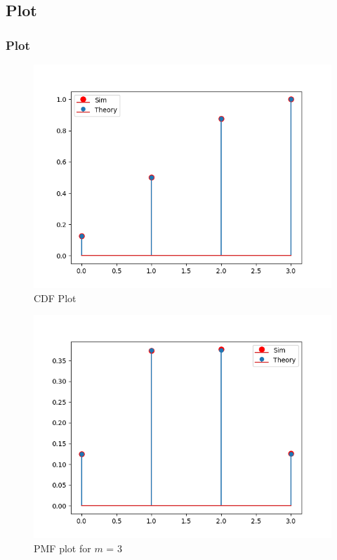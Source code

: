 \documentclass{beamer}
\theoremstyle{remark}
\numberwithin{equation}{section}
\begin{document}
\subsection{Plot}
\begin{frame}
\frametitle{Plot}
\begin{figure}[h!]
  \centering
  \includegraphics[width=0.7\columnwidth]{figs/cdf.png}
  \caption{CDF Plot}
  \label{label}
\end{figure}
\end{frame}

\begin{frame}
\begin{figure}[h!]
  \centering
  \includegraphics[width=0.7\columnwidth]{figs/pmf.png}
  \caption{PMF plot for $m$ = 3}
  \label{label}
\end{figure}
\end{frame}
\end{document}
